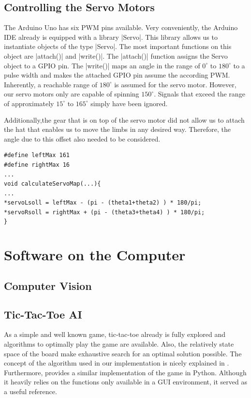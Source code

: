 \documentclass{sig-alternate-05-2015}
\begin{document}
\subsection{Controlling the Servo Motors}
The Arduino Uno has six PWM pins available.
Very conveniently, the Arduino IDE already is equipped with a library |Servo|. This library allows us to instantiate objects of the type |Servo|. The most important functions on this object are |attach()| and |write()|. The |attach()| function assigns the Servo object to a GPIO pin. The |write()| maps an angle in the range of $0^\circ$ to $180^\circ$ to a pulse width and makes the attached GPIO pin assume the according PWM. Inherently, a reachable range of $180^\circ$ is assumed for the servo motor. However, our servo motors only are capable of spinning $150^\circ$. Signals that exceed the range of approximately $15^\circ$ to $165^\circ$ simply have been ignored.

Additionally,the gear that is on top of the servo motor did not allow us to attach the hat that enables us to move the limbs in any desired way. Therefore, the angle due to this offset also needed to be considered. 
\begin{lstlisting}[caption = Finding the right angle]
#define leftMax 161
#define rightMax 16
...
void calculateServoMap(...){
...
*servoLsoll = leftMax - (pi - (theta1+theta2) ) * 180/pi; 
*servoRsoll = rightMax + (pi - (theta3+theta4) ) * 180/pi;
}
\end{lstlisting}

\section{Software on the Computer}
\subsection{Computer Vision}
\subsection{Tic-Tac-Toe AI}
As a simple and well known game, tic-tac-toe already is fully explored and algorithms to optimally play the game are available. Also, the relatively state space of the board make exhaustive search for an optimal solution possible. The concept of the algorithm used in our implementation is nicely explained in \cite{NSB}.
Furthermore, \cite{vdS} provides a similar implementation of the game in Python. Although it heavily relies on the functions only available in a GUI environment, it served as a useful reference.
\end{document}
